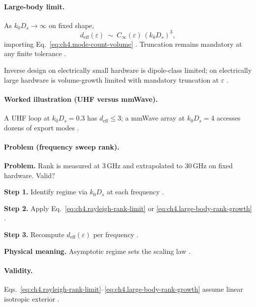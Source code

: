\paragraph{Large-body limit.}
As \(k_{0}D_{s}\to\infty\) on fixed shape,
\begin{equation}
\label{eq:ch4.large-body-rank-growth}
d_{\mathrm{eff}}(\varepsilon)
\ \sim\
C_{\infty}(\varepsilon)\,(k_{0}D_{s})^{3},
\end{equation}
importing Eq.~\eqref{eq:ch4.mode-count-volume} \cite{stratton1941,jackson1999,hansen1988}. Truncation remains mandatory at any
finite tolerance \cite{harrington2001}.

\begin{corollary}
\label{cor:ch4.asymptotic-regimes}
Inverse design on electrically small hardware is dipole-class limited; on electrically large hardware is volume-growth limited with
mandatory truncation at \(\varepsilon\) \cite{stratton1941,jackson1999,hansen1988,harrington2001,devaney2004}.
\end{corollary}

\paragraph{Worked illustration (UHF versus mmWave).}
A UHF loop at \(k_{0}D_{s}=0.3\) has \(d_{\mathrm{eff}}\le3\); a mmWave array at \(k_{0}D_{s}=4\) accesses dozens of export modes
\cite{jackson1999,harrington2001,collin2001}.

\paragraph{Problem (frequency sweep rank).}
\textbf{Problem.} Rank is measured at 3\,GHz and extrapolated to 30\,GHz on fixed hardware. Valid?

\textbf{Step 1.} Identify regime via \(k_{0}D_{s}\) at each frequency \cite{jackson1999,stratton1941}.

\textbf{Step 2.} Apply Eq.~\eqref{eq:ch4.rayleigh-rank-limit} or \eqref{eq:ch4.large-body-rank-growth} \cite{hansen1988,harrington2001}.

\textbf{Step 3.} Recompute \(d_{\mathrm{eff}}(\varepsilon)\) per frequency \cite{devaney2004}.

\textbf{Physical meaning.} Asymptotic regime sets the scaling law \cite{stratton1941}.

\paragraph{Validity.}
Eqs.~\eqref{eq:ch4.rayleigh-rank-limit}--\eqref{eq:ch4.large-body-rank-growth} assume linear isotropic exterior \cite{stratton1941}.


